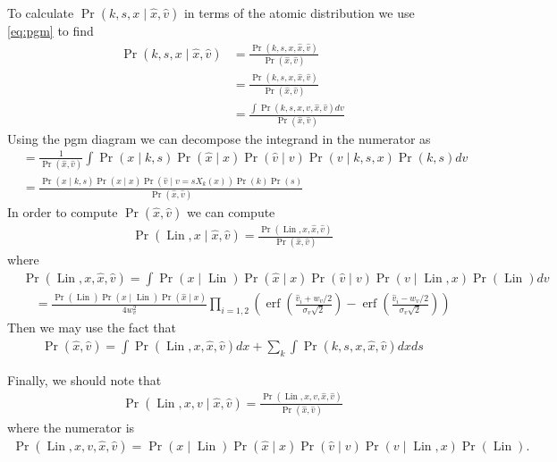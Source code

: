 \documentclass[12pt]{amsart}
\DeclareMathOperator{\Lin}{Lin}
\DeclareMathOperator{\erf}{erf}
\begin{document}
To calculate $\Pr(k,s,x \mid \hat{x}, \hat{v} )$ in terms of the atomic distribution we use \eqref{eq:pgm} to find
\begin{align*}
	\Pr( k,s,x \mid \hat{x}, \hat{v}) &= \frac{ \Pr(k, s, x, \hat{x}, \hat{v} ) }{ \Pr( \hat{x}, \hat{v} ) } \\
		&= \frac{ \Pr(k,s,x, \hat{x}, \hat{v} ) }{ \Pr( \hat{x}, \hat{v}) } \\
		&= \frac{ \int \Pr(k, s, x, v, \hat{x}, \hat{v} ) dv }{ \Pr( \hat{x}, \hat{v} ) }
\end{align*}
Using the pgm diagram we can decompose the integrand in the numerator as
\begin{align*}
	&= \frac{1}{ \Pr( \hat{x}, \hat{v} ) } \int \Pr( x \mid k,s) \Pr( \hat{x} \mid x ) \Pr( \hat{v} \mid v) \Pr( v \mid k,s,x) \Pr(k,s) dv \\
	&= \frac{ \Pr( x \mid k,s) \Pr( \hat{x} \mid x ) \Pr( \hat{v} \mid v = s X_k(x) ) \Pr(k) \Pr(s) }{ \Pr( \hat{x} , \hat{v} ) }
\end{align*}
In order to compute $\Pr( \hat{x}, \hat{v})$ we can compute
\begin{align*}
	\Pr( \Lin , x \mid \hat{x} , \hat{v} ) = \frac{ \Pr( \Lin , x, \hat{x}, \hat{v} ) }{ \Pr( \hat{x}, \hat{v} ) } 
\end{align*}
where
\begin{align*}
	&\Pr( \Lin, x, \hat{x}, \hat{v} ) = \int \Pr( x \mid \Lin ) \Pr( \hat{x} \mid x ) \Pr( \hat{v} \mid v) \Pr( v \mid \Lin ,x) \Pr(\Lin) dv \\
	&\quad = \frac{ \Pr( \Lin ) \Pr( x \mid \Lin ) \Pr( \hat{x} \mid x ) }{ 4 w_v^2} \prod_{i=1,2} \left( \erf \left( \frac{ \hat{v}_i + w_v/2}{ \sigma_v \sqrt{2} } \right) - \erf \left( \frac{ \hat{v}_i - w_v/2}{ \sigma_v \sqrt{2} } \right) \right)
\end{align*}
Then we may use the fact that
\begin{align*}
	\Pr( \hat{x}, \hat{v} ) = \int \Pr( \Lin , x , \hat{x}, \hat{v} )dx  + \sum_{k} \int \Pr( k,s, x , \hat{x} , \hat{v} ) dx ds
\end{align*}

Finally, we should note that
\begin{align*}
	\Pr( \Lin , x, v \mid \hat{x}, \hat{v} ) = \frac{ \Pr( \Lin , x, v ,\hat{x}, \hat{v} ) }{ \Pr( \hat{x} , \hat{v} ) }
\end{align*}
where the numerator is
\begin{align*}
	\Pr( \Lin, x, v, \hat{x}, \hat{v} ) = \Pr( x \mid \Lin ) \Pr( \hat{x} \mid x ) \Pr( \hat{v} \mid v) \Pr( v \mid \Lin ,x) \Pr(\Lin).
\end{align*}
\end{document}
